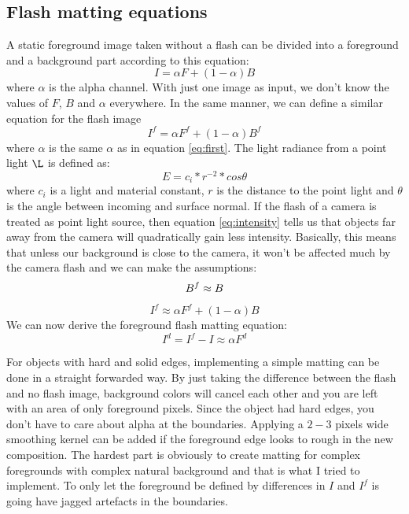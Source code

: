 \documentclass[10pt,letterpaper,twocolumn]{article}
\begin{document}
\subsection{Flash matting equations}
A static foreground image taken without a flash can be divided into a foreground and a background part according to this equation:
\begin{equation}
I = \alpha F + (1 - \alpha) B
\label{eq:first}
\end{equation}
where $\alpha$ is the alpha channel. With just one image as input, we don't know the values of $F$, $B$ and $\alpha$ everywhere. In the same manner, we can define a similar equation for the flash image
\begin{equation}
I^f = \alpha F^f + (1 - \alpha) B^f
\end{equation}
where $\alpha$ is the same $\alpha$ as in equation \ref{eq:first}. The light radiance from a point light $\L$ is defined as:
\begin{equation}
E = c_i * r^{-2} * cos \theta
\label{eq:intensity}
\end{equation}
where $c_i$ is a light and material constant, $r$ is the distance to the point light and $\theta$ is the angle between incoming and surface normal. If the flash of a camera is treated as point light source, then equation \ref{eq:intensity} tells us that objects far away from the camera will quadratically gain less intensity. Basically, this means that unless our background is close to the camera, it won't be affected much by the camera flash and we can make the assumptions:
\begin{equation}
B^f \approx B\\
\end{equation}
\begin{equation}
I^f \approx \alpha F^f + (1-\alpha) B
\end{equation}
We can now derive the foreground flash matting equation:
\begin{equation}
I^d = I^f - I \approx \alpha F^d
\end{equation}

For objects with hard and solid edges, implementing a simple matting can be done in a straight forwarded way. By just taking the difference between the flash and no flash image, background colors will cancel each other and you are left with an area of only foreground pixels. Since the object had hard edges, you don't have to care about alpha at the boundaries. Applying a $2-3$ pixels wide smoothing kernel can be added if the foreground edge looks to rough in the new composition. The hardest part is obviously to create matting for complex foregrounds with complex natural background and that is what I tried to implement. To only let the foreground be defined by differences in $I$ and $I^f$ is going have jagged artefacts in the boundaries.
\end{document}
